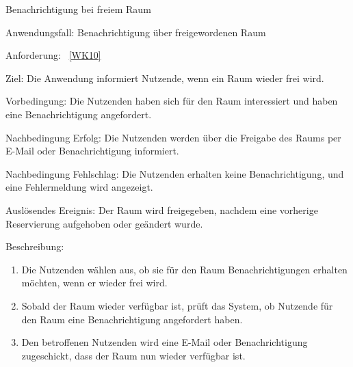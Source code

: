 \begin{function}{70}{Benachrichtigung bei freiem Raum}
    \item[Anwendungsfall:] Benachrichtigung über freigewordenen Raum
    \item[Anforderung:] ~\ref{WK10}
    \item[Ziel:] Die Anwendung informiert Nutzende, wenn ein Raum wieder frei wird.
    \item[Vorbedingung:] Die Nutzenden haben sich für den Raum interessiert und haben eine Benachrichtigung angefordert.
    \item[Nachbedingung Erfolg:] Die Nutzenden werden über die Freigabe des Raums per E-Mail oder Benachrichtigung informiert.
    \item[Nachbedingung Fehlschlag:] Die Nutzenden erhalten keine Benachrichtigung, und eine Fehlermeldung wird angezeigt.
    \item[Auslösendes Ereignis:] Der Raum wird freigegeben, nachdem eine vorherige Reservierung aufgehoben oder geändert wurde.
    \item[Beschreibung:] ~
    \begin{enumerate}
        \item Die Nutzenden wählen aus, ob sie für den Raum Benachrichtigungen erhalten möchten, wenn er wieder frei wird.
        \item Sobald der Raum wieder verfügbar ist, prüft das System, ob Nutzende für den Raum eine Benachrichtigung angefordert haben.
        \item Den betroffenen Nutzenden wird eine E-Mail oder Benachrichtigung zugeschickt, dass der Raum nun wieder verfügbar ist.
    \end{enumerate}
\end{function}

\pagebreak


